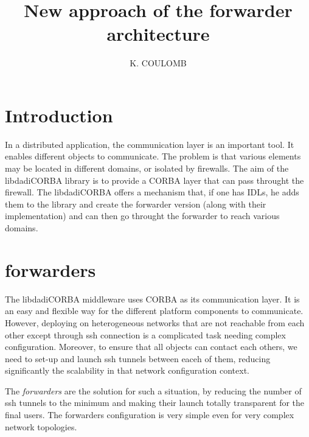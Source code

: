 \documentclass{report}
\title{New approach of the forwarder architecture}
\author{K. COULOMB}
\begin{document}
\frontmatter %
\maketitle %
\mainmatter %



\chapter*{Introduction}


In a distributed application, the communication layer is an important tool. It
enables different objects to communicate. The problem is that various elements
may be located in different domains, or isolated by firewalls. The aim of the 
libdadiCORBA library is to provide a CORBA layer that can pass throught the 
firewall. The libdadiCORBA offers a mechanism that, if one has IDLs, he adds 
them to the library and create the forwarder version (along with their 
implementation) and can then go throught the forwarder to reach various domains.

\chapter*{forwarders}
\label{ch:forwarders}
The libdadiCORBA middleware uses CORBA as its communication layer. It is an easy
and flexible way for the different platform components to communicate.
However, deploying on heterogeneous networks that are not
reachable from each other except through ssh connection is a complicated
task needing complex configuration. Moreover, to ensure that all
objects can contact each others, we need to set-up and launch ssh
tunnels between eaceh of them, reducing significantly the
scalability in that network configuration context.

The \textit{forwarders} are the solution for such a situation, by
reducing the number of ssh tunnels to the minimum and making their
launch totally transparent for the final users. The forwarders
configuration is very simple even for very complex network topologies.
\end{document}
